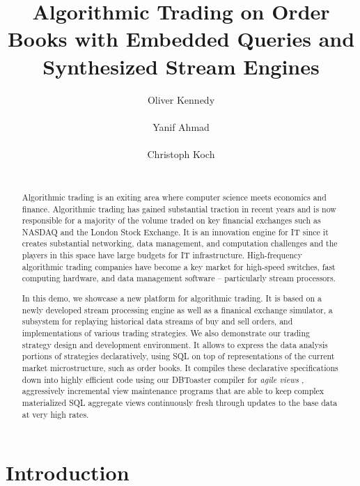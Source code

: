 \documentclass{vldb}
\begin{document}
\title{Algorithmic Trading on Order Books with Embedded Queries and Synthesized
Stream Engines}
\author{
\alignauthor
Oliver Kennedy\\
\\
\alignauthor
Yanif Ahmad\\
\\
\alignauthor
Christoph Koch\\
\\
}
\maketitle

\begin{abstract}
Algorithmic trading is an exiting area where computer science
meets economics and finance. Algorithmic
trading has gained substantial traction in recent years and is now
responsible
for a majority of the volume traded on key financial exchanges such as
NASDAQ and the London Stock Exchange.
It is an innovation engine for IT since it creates substantial
networking, data management, and computation challenges and
the players in this space have large budgets for IT infrastructure.
High-frequency algorithmic trading companies have
become a key market for high-speed switches, fast computing hardware, and data
management software -- particularly stream processors.

In this demo, we showcase a new platform for algorithmic trading.
It is based on a newly developed stream processing engine
as well as a finanical exchange simulator, a subsystem for replaying
historical data streams of buy and sell orders,
and implementations of various trading strategies.
We also demonstrate our trading strategy design and development environment.
It allows to express the data analysis portions of strategies
declaratively, using SQL on top of representations of the current
market microstructure, such as order books.
It compiles these declarative specifications down into highly efficient
code using our DBToaster compiler for {\em agile views} \cite{KAK2011},
aggressively incremental view maintenance programs that are able to
keep complex materialized SQL aggregate views continuously fresh through
updates to the base data at very high rates.
\end{abstract}

\section{Introduction}
\end{document}
